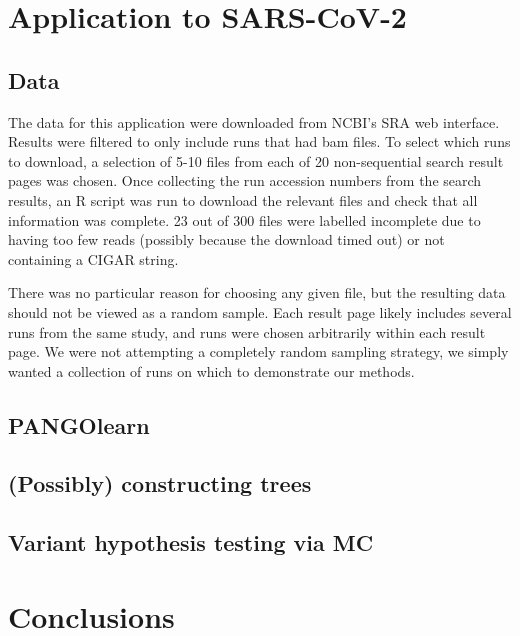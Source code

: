 \documentclass[
]{article}
\begin{document}
\hypertarget{application-to-sars-cov-2}{%
\section{Application to SARS-CoV-2}\label{application-to-sars-cov-2}}

\hypertarget{data}{%
\subsection{Data}\label{data}}

The data for this application were downloaded from NCBI's SRA web
interface. Results were filtered to only include runs that had bam
files. To select which runs to download, a selection of 5-10 files from
each of 20 non-sequential search result pages was chosen. Once
collecting the run accession numbers from the search results, an R
script was run to download the relevant files and check that all
information was complete. 23 out of 300 files were labelled incomplete
due to having too few reads (possibly because the download timed out) or
not containing a CIGAR string.

There was no particular reason for choosing any given file, but the
resulting data should not be viewed as a random sample. Each result page
likely includes several runs from the same study, and runs were chosen
arbitrarily within each result page. We were not attempting a completely
random sampling strategy, we simply wanted a collection of runs on which
to demonstrate our methods.

\hypertarget{pangolearn}{%
\subsection{PANGOlearn}\label{pangolearn}}

\hypertarget{possibly-constructing-trees}{%
\subsection{(Possibly) constructing
trees}\label{possibly-constructing-trees}}

\hypertarget{variant-hypothesis-testing-via-mc}{%
\subsection{Variant hypothesis testing via
MC}\label{variant-hypothesis-testing-via-mc}}

\hypertarget{conclusions}{%
\section{Conclusions}\label{conclusions}}
\end{document}
